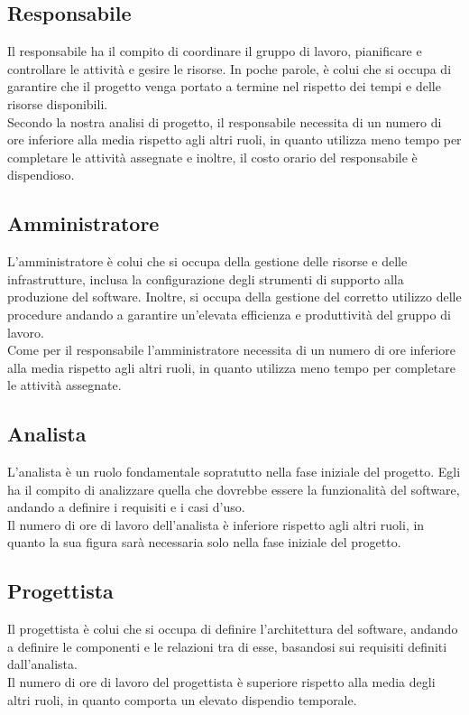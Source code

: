 \documentclass[italian,12pt]{article} %
\begin{document}
\subsection{Responsabile}
Il responsabile ha il compito di coordinare il gruppo di lavoro, pianificare e controllare le attività e gesire le risorse.
In poche parole, è colui che si occupa di garantire che il progetto venga portato a termine nel rispetto dei tempi e delle risorse disponibili.\\
Secondo la nostra analisi di progetto, il responsabile necessita di un numero di ore inferiore alla media rispetto agli altri ruoli, in quanto utilizza meno tempo per completare le attività assegnate e inoltre,
il costo orario del responsabile è dispendioso.

\subsection{Amministratore}
L'amministratore è colui che si occupa della gestione delle risorse e delle infrastrutture, inclusa la configurazione degli strumenti di supporto alla produzione del software.
Inoltre, si occupa della gestione del corretto utilizzo delle procedure andando a garantire un'elevata efficienza e produttività del gruppo di lavoro.\\
Come per il responsabile l'amministratore necessita di un numero di ore inferiore alla media rispetto agli altri ruoli, in quanto utilizza meno tempo per completare le attività assegnate.

\subsection{Analista}
L'analista è un ruolo fondamentale sopratutto nella fase iniziale del progetto.
Egli ha il compito di analizzare quella che dovrebbe essere la funzionalità del software, andando a definire i requisiti e i casi d'uso.\\
Il numero di ore di lavoro dell'analista è inferiore rispetto agli altri ruoli, in quanto la sua figura sarà necessaria solo nella fase iniziale del progetto.

\subsection{Progettista}
Il progettista è colui che si occupa di definire l'architettura del software, andando a definire le componenti e le relazioni tra di esse, basandosi sui requisiti definiti dall'analista.\\
Il numero di ore di lavoro del progettista è superiore rispetto alla media degli altri ruoli, in quanto comporta un elevato dispendio temporale.
\end{document}
